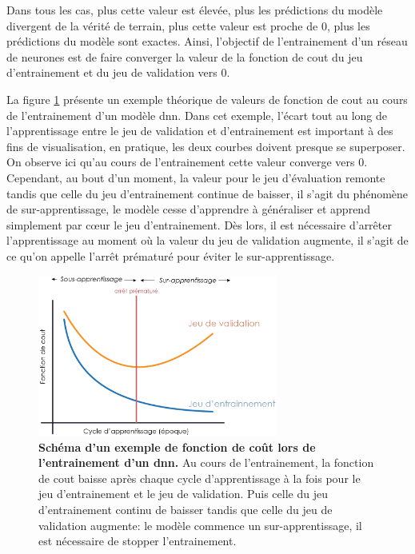 Dans tous les cas, plus cette valeur est élevée, plus les prédictions du modèle divergent de la vérité de terrain, plus cette valeur est proche de 0, plus les prédictions du modèle sont exactes. Ainsi, l'objectif de l'entrainement d'un réseau de neurones est de faire converger la valeur de la fonction de cout du jeu d'entrainement et du jeu de validation vers 0. 


La figure \ref{fig:loss_func} présente un exemple théorique de valeurs de fonction de cout au cours de l'entrainement d'un modèle \gls{dnn}. Dans cet exemple, l'écart tout au long de l'apprentissage entre le jeu de validation et d'entrainement est important à des fins de visualisation, en pratique, les deux courbes doivent presque se superposer. On observe ici qu'au cours de l'entrainement cette valeur converge vers 0. Cependant, au bout d'un moment, la valeur pour le jeu d'évaluation remonte tandis que celle du jeu d'entrainement continue de baisser, il s'agit du phénomène de sur-apprentissage, le modèle cesse d'apprendre à généraliser et apprend simplement par cœur le jeu d'entrainement. Dès lors, il est nécessaire d'arrêter l'apprentissage au moment où la valeur du jeu de validation augmente, il s'agit de ce qu'on appelle l'arrêt prématuré pour éviter le sur-apprentissage.
\begin{figure}[!htbp]
 \centering
 \includegraphics[width=0.7\textwidth]{figures/loss_function.png}
 \caption[Schéma d'un exemple de fonction de coût lors d'un entraînement]{\textbf{Schéma d'un exemple de fonction de coût lors de l'entrainement d'un \gls{dnn}.} Au cours de l'entrainement, la fonction de cout baisse après chaque cycle d'apprentissage à la fois pour le jeu d'entrainement et le jeu de validation. Puis celle du jeu d'entrainement continu de baisser tandis que celle du jeu de validation augmente: le modèle commence un sur-apprentissage, il est nécessaire de stopper l'entrainement.}
 \label{fig:loss_func}
\end{figure}
